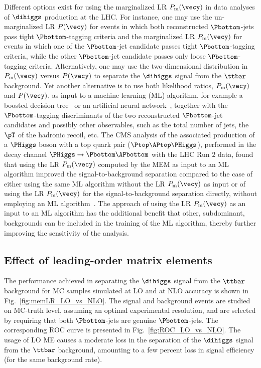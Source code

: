 Different options exist for using the marginalized LR $P_{\textrm{m}}(\vecy)$ in data analyses of $\dihiggs$ production at the LHC.
For instance, one may use the un-marginalized LR $P(\vecy)$ for events in which both reconstructed $\Pbottom$-jets pass tight $\Pbottom$-tagging criteria
and the marginalized LR $P_{\textrm{m}}(\vecy)$ for events in which one of the $\Pbottom$-jet candidate passes tight $\Pbottom$-tagging criteria,
while the other $\Pbottom$-jet candidate passes only loose $\Pbottom$-tagging criteria.
Alternatively, one may use the two-dimensional distribution in $P_{\textrm{m}}(\vecy)$ versus $P(\vecy)$ to separate the $\dihiggs$ signal from the $\ttbar$ background.
Yet another alternative is to use both likelihood ratios, $P_{\textrm{m}}(\vecy)$ and $P(\vecy)$,
as input to a machine-learning (ML) algorithm, for example a boosted decision tree~\cite{BDT} or an artificial neural network~\cite{ANN,chollet2015keras},
together with the $\Pbottom$-tagging discriminants of the two reconstructed $\Pbottom$-jet candidates and possibly other observables,
such as the total number of jets, the $\pT$ of the hadronic recoil, etc.
The CMS analysis of the associated production of a $\PHiggs$ boson with a top quark pair ($\Ptop\APtop\PHiggs$),
performed in the decay channel $\PHiggs \to \Pbottom\APbottom$ with the LHC Run $2$ data,
found that using the LR $P_{\textrm{m}}(\vecy)$ computed by the MEM as input to an ML algorithm
improved the signal-to-background separation compared to the case of either using the same ML algorithm without the LR $P_{\textrm{m}}(\vecy)$ as input
or of using the LR $P_{\textrm{m}}(\vecy)$ for the signal-to-background separation directly, without employing an ML algorithm~\cite{Sirunyan:2018mvw}.
The approach of using the LR $P_{\textrm{m}}(\vecy)$ as an input to an ML algorithm has the additional benefit
that other, subdominant, backgrounds can be included in the training of the ML algorithm, thereby further improving the sensitivity of the analysis.


\subsection{Effect of leading-order matrix elements}

The performance achieved in separating the $\dihiggs$ signal from the $\ttbar$ background
for MC samples simulated at LO and at NLO accuracy is shown in Fig.~\ref{fig:memLR_LO_vs_NLO}.
The signal and background events are studied on MC-truth level, assuming an optimal experimental resolution,
and are selected by requiring that both $\Pbottom$-jets are genuine $\Pbottom$-jets.
The corresponding ROC curve is presented in Fig.~\ref{fig:ROC_LO_vs_NLO}.
The usage of LO ME causes a moderate loss in the separation of the $\dihiggs$ signal from the $\ttbar$ background,
amounting to a few percent loss in signal efficiency (for the same background rate).

